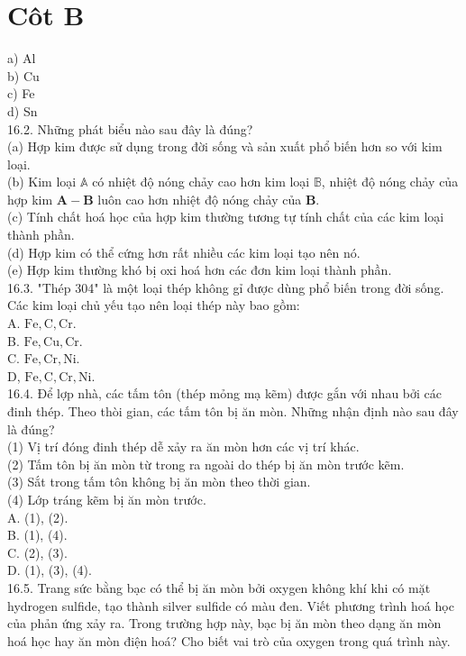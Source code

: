 \documentclass[10pt]{article}
\begin{document}
\section*{Côt B}
a) Al\\
b) Cu\\
c) Fe\\
d) Sn\\
16.2. Những phát biểu nào sau đây là đúng?\\
(a) Hợp kim được sử dụng trong đời sống và sản xuất phổ biến hơn so với kim loại.\\
(b) Kim loại $\mathbb{A}$ có nhiệt độ nóng chảy cao hơn kim loại $\mathbb{B}$, nhiệt độ nóng chảy của hợp kim $\mathbf{A}-\mathbf{B}$ luôn cao hơn nhiệt độ nóng chảy của $\mathbf{B}$.\\
(c) Tính chất hoá học của hợp kim thường tương tự tính chất của các kim loại thành phần.\\
(d) Hợp kim có thể cứng hơn rất nhiều các kim loại tạo nên nó.\\
(e) Hợp kim thường khó bị oxi hoá hơn các đơn kim loại thành phần.\\
16.3. "Thép 304" là một loại thép không gỉ được dùng phổ biến trong đời sống. Các kim loại chủ yếu tạo nên loại thép này bao gồm:\\
A. $\mathrm{Fe}, \mathrm{C}, \mathrm{Cr}$.\\
B. $\mathrm{Fe}, \mathrm{Cu}, \mathrm{Cr}$.\\
C. $\mathrm{Fe}, \mathrm{Cr}, \mathrm{Ni}$.\\
D, $\mathrm{Fe}, \mathrm{C}, \mathrm{Cr}, \mathrm{Ni}$.\\
16.4. Để lợp nhà, các tấm tôn (thép mỏng mạ kẽm) được gắn với nhau bởi các đinh thép. Theo thòi gian, các tấm tôn bị ăn mòn. Những nhận định nào sau đây là đúng?\\
(1) Vị trí đóng đinh thép dễ xảy ra ăn mòn hơn các vị trí khác.\\
(2) Tấm tôn bị ăn mòn từ trong ra ngoài do thép bị ăn mòn trước kẽm.\\
(3) Sắt trong tấm tôn không bị ăn mòn theo thời gian.\\
(4) Lớp tráng kẽm bị ăn mòn trước.\\
A. (1), (2).\\
B. (1), (4).\\
C. (2), (3).\\
D. (1), (3), (4).\\
16.5. Trang sức bằng bạc có thể bị ăn mòn bởi oxygen không khí khi có mặt hydrogen sulfide, tạo thành silver sulfide có màu đen. Viết phương trình hoá học của phản ứng xảy ra. Trong trường hợp này, bạc bị ăn mòn theo dạng ăn mòn hoá học hay ăn mòn điện hoá? Cho biết vai trò của oxygen trong quá trình này.\\
\end{document}
